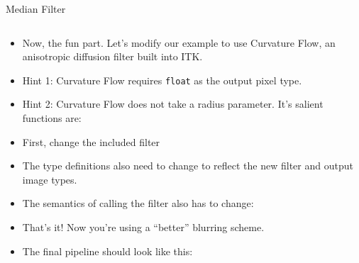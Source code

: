 \begin{frame}
\begin{columns}[c]
\begin{center}
Median Filter
\end{center}
\end{columns}
\pause
\begin{itemize}
\item Now, the fun part. Let's modify our example to use Curvature Flow, an
anisotropic diffusion filter built into ITK.
\end{itemize}
\end{frame}


\begin{frame}
\begin{itemize}
\frametitle{Exercise 1}
\framesubtitle{ITKOpenCVBridge/exercise1/BasicFilteringITKOpenCVBridge.cxx}
\item Hint 1: Curvature Flow requires {\tt float} as the output pixel
  type.
\pause
\item Hint 2: Curvature Flow does not take a radius parameter. It's
  salient functions are:
\end{itemize}
\end{frame}

\begin{frame}
\begin{itemize}
\frametitle{Exercise 1: Answer}
\framesubtitle{ITKOpenCVBridge/exercise1/BasicFilteringITKOpenCVBridgeAnswer.cxx}
\item First, change the included filter
\pause
\item The type definitions also need to change to reflect the new
  filter and output image types.
\end{itemize}
\end{frame}

\begin{frame}
\begin{itemize}
\frametitle{Exercise 1: Answer}
\framesubtitle{ITKOpenCVBridge/exercise1/BasicFilteringITKOpenCVBridgeAnswer.cxx}
\item The semantics of calling the filter also has to change:
\pause
\item That's it! Now you're using a ``better'' blurring scheme.
\end{itemize}
\end{frame}

\begin{frame}
\begin{itemize}
\frametitle{Exercise 1: Answer}
\framesubtitle{ITKOpenCVBridge/exercise1/BasicFilteringITKOpenCVBridgeAnswer.cxx}
\item The final pipeline should look like this:
\end{itemize}
\end{frame}

